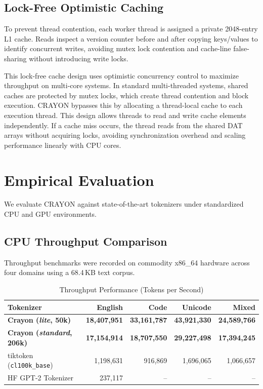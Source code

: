 \documentclass[10pt,journal,compsoc]{IEEEtran}
\begin{document}
\subsection{Lock-Free Optimistic Caching}
To prevent thread contention, each worker thread is assigned a private 2048-entry L1 cache. 
Reads inspect a version counter before and after copying keys/values to identify concurrent writes, avoiding mutex lock contention and cache-line false-sharing without introducing write locks.

This lock-free cache design uses optimistic concurrency control to maximize throughput on multi-core systems. In standard multi-threaded systems, shared caches are protected by mutex locks, which create thread contention and block execution. CRAYON bypasses this by allocating a thread-local cache to each execution thread. This design allows threads to read and write cache elements independently. If a cache miss occurs, the thread reads from the shared DAT arrays without acquiring locks, avoiding synchronization overhead and scaling performance linearly with CPU cores.

\section{Empirical Evaluation}
We evaluate CRAYON against state-of-the-art tokenizers under standardized CPU and GPU environments.

\subsection{CPU Throughput Comparison}
Throughput benchmarks were recorded on commodity x86\_64 hardware across four domains using a 68.4\,KB text corpus.

\begin{table}[h]
\centering
\caption{Throughput Performance (Tokens per Second)}
\label{tab:throughput}
\begin{tabular}{lrrrr}
\toprule
Tokenizer & English & Code & Unicode & Mixed \\
\midrule
\textbf{Crayon (\textit{lite}, 50k)} & \textbf{18,407,951} & \textbf{33,161,787} & \textbf{43,921,330} & \textbf{24,589,766} \\
\textbf{Crayon (\textit{standard}, 206k)} & \textbf{17,154,914} & \textbf{18,707,550} & \textbf{29,227,498} & \textbf{17,394,245} \\
tiktoken (\texttt{cl100k\_base}) & 1,198,631 & 916,869 & 1,696,065 & 1,066,657 \\
HF GPT-2 Tokenizer & 237,117 & -- & -- & -- \\
\bottomrule
\end{tabular}
\end{table}
\end{document}
